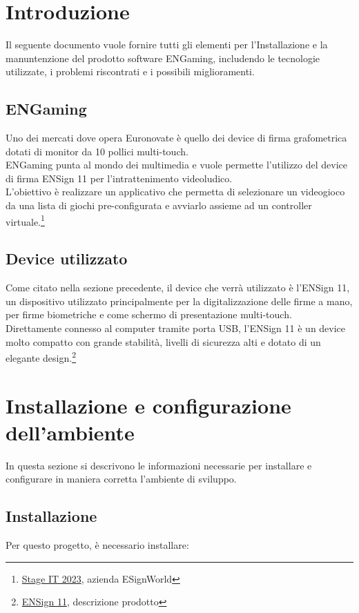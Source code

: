\section{Introduzione}

Il seguente documento vuole fornire tutti gli elementi per l'Installazione e la manuntenzione del prodotto software ENGaming, includendo le tecnologie utilizzate, i problemi riscontrati e i possibili miglioramenti.

\subsection{ENGaming}

Uno dei mercati dove opera Euronovate è quello dei device di firma grafometrica dotati di monitor da 10 pollici multi-touch.\\ 
ENGaming punta al mondo dei multimedia e vuole permette l'utilizzo del device di firma ENSign 11 per l'intrattenimento videoludico.\\ 
L'obiettivo è realizzare un applicativo che permetta di selezionare un videogioco da una lista di giochi pre-configurata e avviarlo assieme ad un controller virtuale.\footnote[1]{\href{https://www.assindustriavenetocentro.it/2023/stage-it}{Stage IT 2023}, azienda ESignWorld}

\subsection{Device utilizzato}

Come citato nella sezione precedente, il device che verrà utilizzato è l'ENSign 11, un dispositivo utilizzato principalmente per la digitalizzazione delle firme a mano, per firme biometriche e come schermo di presentazione multi-touch.\\
Direttamente connesso al computer tramite porta USB, l'ENSign 11 è un device molto compatto con grande stabilità, livelli di sicurezza alti e dotato di un elegante design.\footnote[2]{\href{https://www.euronovategroup.com/solutions/product-map/ensign-11-ensign-nfc-hardware}{ENSign 11}, descrizione prodotto}

\newpage
\section{Installazione e configurazione dell'ambiente}
In questa sezione si descrivono le informazioni necessarie per installare e configurare in maniera corretta l'ambiente di sviluppo.
\subsection{Installazione}
Per questo progetto, è necessario installare:

